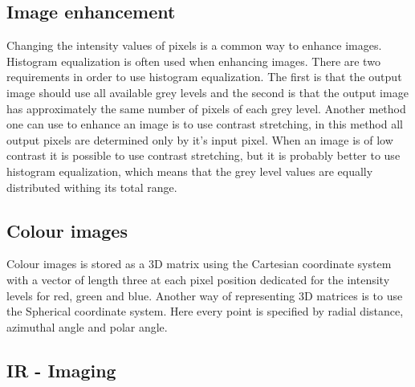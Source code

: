 \subsection{Image enhancement}
Changing the intensity values of pixels is a common way to enhance images. Histogram equalization is often used when enhancing images. There are two requirements in order to use histogram equalization. The first is that the output image should use all available grey levels and the second is that the output image has approximately the same number of pixels of each grey level. Another method one can use to enhance an image is to use contrast stretching, in this method all output pixels are determined only by it's input pixel. When an image is of low contrast it is possible to use contrast stretching, but it is probably better to use histogram equalization, which means that the grey level values are equally distributed withing its total range.


\subsection{Colour images}
Colour images is stored as a 3D matrix using the Cartesian coordinate system with a vector of length three at each pixel position dedicated for the intensity levels for red, green and blue. Another way of representing 3D matrices is to use the Spherical coordinate system. Here every point is specified by radial distance, azimuthal angle and polar angle.

\subsection{IR - Imaging}